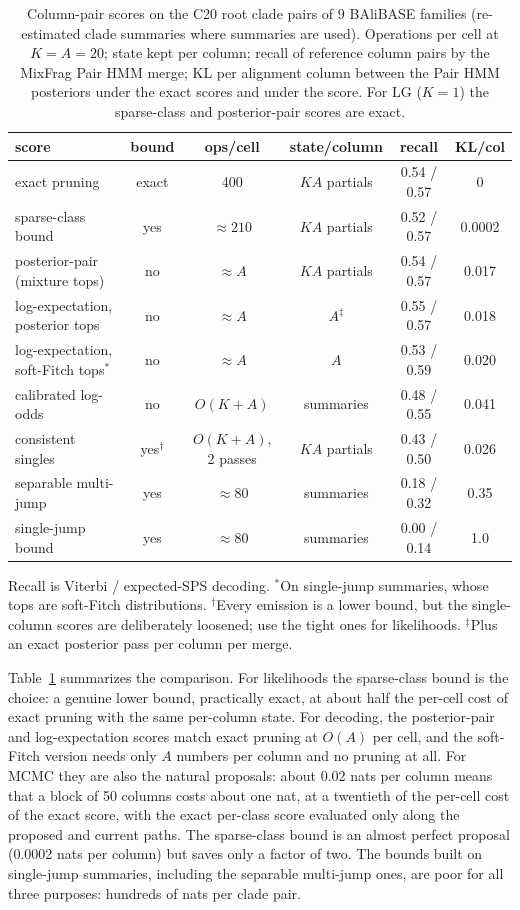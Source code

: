 \documentclass[11pt]{article}
\begin{document}
\begin{table}[t]
\centering
\footnotesize
\setlength{\tabcolsep}{4pt}
\caption{Column-pair scores on the C20 root clade pairs of 9 BAliBASE families
(re-estimated clade summaries where summaries are used). Operations per cell at
$K=A=20$; state kept per column; recall of reference column pairs by the
MixFrag Pair HMM merge; KL per alignment column between the Pair HMM posteriors
under the exact scores and under the score. For LG ($K=1$) the sparse-class and
posterior-pair scores are exact.}
\label{tab:choose}
\begin{tabular}{lccccc}
\toprule
score & bound & ops/cell & state/column & recall & KL/col\\
\midrule
exact pruning & exact & 400 & $KA$ partials & 0.54 / 0.57 & 0\\
sparse-class bound & yes & $\approx210$ & $KA$ partials & 0.52 / 0.57 & 0.0002\\
posterior-pair (mixture tops) & no & $\approx A$ & $KA$ partials & 0.54 / 0.57 & 0.017\\
log-expectation, posterior tops & no & $\approx A$ & $A$$^\ddagger$ & 0.55 / 0.57 & 0.018\\
log-expectation, soft-Fitch tops$^*$ & no & $\approx A$ & $A$ & 0.53 / 0.59 & 0.020\\
calibrated log-odds & no & $O(K{+}A)$ & summaries & 0.48 / 0.55 & 0.041\\
consistent singles & yes$^\dagger$ & $O(K{+}A)$, 2 passes & $KA$ partials & 0.43 / 0.50 & 0.026\\
separable multi-jump & yes & $\approx80$ & summaries & 0.18 / 0.32 & 0.35\\
single-jump bound & yes & $\approx80$ & summaries & 0.00 / 0.14 & 1.0\\
\bottomrule
\end{tabular}

\smallskip
{\footnotesize Recall is Viterbi / expected-SPS decoding. $^*$On single-jump
summaries, whose tops are soft-Fitch distributions. $^\dagger$Every emission is
a lower bound, but the single-column scores are deliberately loosened; use the
tight ones for likelihoods. $^\ddagger$Plus an exact posterior pass per column
per merge.}
\end{table}

Table~\ref{tab:choose} summarizes the comparison. For likelihoods the
sparse-class bound is the choice: a genuine lower bound, practically exact, at
about half the per-cell cost of exact pruning with the same per-column state.
For decoding, the posterior-pair and log-expectation scores match exact pruning
at $O(A)$ per cell, and the soft-Fitch version needs only $A$ numbers per column
and no pruning at all. For MCMC they are also the natural proposals: about
0.02 nats per column means that a block of 50 columns costs about one nat, at a
twentieth of the per-cell cost of the exact score, with the exact per-class
score evaluated only along the proposed and current paths. The sparse-class
bound is an almost perfect proposal (0.0002 nats per column) but saves only a
factor of two. The bounds built on single-jump summaries, including the
separable multi-jump ones, are poor for all three purposes: hundreds of nats per
clade pair.
\end{document}

